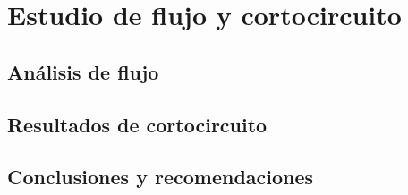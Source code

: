 \documentclass[12pt]{article}
\begin{document}
\section{Estudio de flujo y cortocircuito}

\subsection{Análisis de flujo}

\subsection{Resultados de cortocircuito}

\subsection{Conclusiones y recomendaciones}


\newpage
\vspace*{0.1cm}
\end{document}

